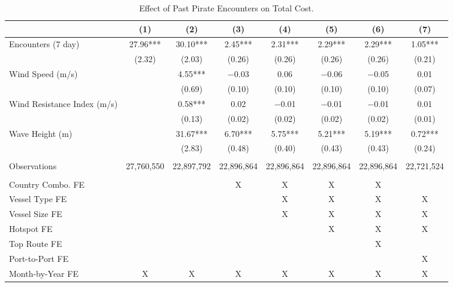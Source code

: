 \begin{table}
\centering
\caption{Effect of Past Pirate Encounters on Total Cost. \label{tab:spec-total-table-rev}}
\centering
\begin{adjustbox}{width = .9\textwidth}
\begin{threeparttable}
\begin{tabular}[t]{lccccccc}
\toprule
  & (1) & (2) & (3) & (4) & (5) & (6) & (7)\\
\midrule
Encounters (7 day) & \num{27.96}*** & \num{30.10}*** & \num{2.45}*** & \num{2.31}*** & \num{2.29}*** & \num{2.29}*** & \num{1.05}***\\
 & (\num{2.32}) & (\num{2.03}) & (\num{0.26}) & (\num{0.26}) & (\num{0.26}) & (\num{0.26}) & (\num{0.21})\\
Wind Speed (m/s) &  & \num{4.55}*** & \num{-0.03} & \num{0.06} & \num{-0.06} & \num{-0.05} & \num{0.01}\\
 &  & (\num{0.69}) & (\num{0.10}) & (\num{0.10}) & (\num{0.10}) & (\num{0.10}) & (\num{0.07})\\
Wind Resistance Index (m/s) &  & \num{0.58}*** & \num{0.02} & \num{-0.01} & \num{-0.01} & \num{-0.01} & \num{0.01}\\
 &  & (\num{0.13}) & (\num{0.02}) & (\num{0.02}) & (\num{0.02}) & (\num{0.02}) & (\num{0.01})\\
Wave Height (m) &  & \num{31.67}*** & \num{6.70}*** & \num{5.75}*** & \num{5.21}*** & \num{5.19}*** & \num{0.72}***\\
 &  & (\num{2.83}) & (\num{0.48}) & (\num{0.40}) & (\num{0.43}) & (\num{0.43}) & (\num{0.24})\\
 &  &  &  &  &  &  & \\
Observations & 27,760,550 & 22,897,792 & 22,896,864 & 22,896,864 & 22,896,864 & 22,896,864 & 22,721,524\\
 &  &  &  &  &  &  & \\
Country Combo. FE &  &  & X & X & X & X & \\
Vessel Type FE &  &  &  & X & X & X & X\\
Vessel Size FE &  &  &  & X & X & X & X\\
Hotspot FE &  &  &  &  & X & X & X\\
Top Route FE &  &  &  &  &  & X & \\
Port-to-Port FE &  &  &  &  &  &  & X\\
Month-by-Year FE & X & X & X & X & X & X & X\\
\bottomrule
\end{tabular}
\begin{tablenotes}

\end{tablenotes}
\end{threeparttable}
\end{adjustbox}
\end{table}
